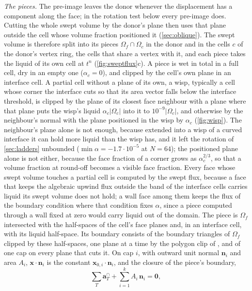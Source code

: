 \documentclass[preprint,12pt]{elsarticle}
\newcommand{\x}{\mathbf{x}}
\newcommand{\n}{\mathbf{n}}
\begin{document}
\emph{The pieces.} The pre-image leaves the donor whenever the displacement has a component along the face; in the rotation test below every pre-image does. Cutting the whole swept volume by the donor's plane then uses that plane outside the cell whose volume fraction positioned it (\cref{sec:oblique}). The swept volume is therefore split into its pieces $\Omega_f\cap\Omega_c$ in the donor and in the cells $c$ of the donor's vertex ring, the cells that share a vertex with it, and each piece takes the liquid of its own cell at $t^n$ (\cref{fig:sweptflux}c). A piece is wet in total in a full cell, dry in an empty one ($\alpha_c = 0$), and clipped by the cell's own plane in an interface cell. A partial cell without a plane of its own, a wisp, typically a cell whose corner the interface cuts so that its area vector falls below the interface threshold, is clipped by the plane of its closest face neighbour with a plane where that plane puts the wisp's liquid $\alpha_c|\Omega_c|$ into it to $10^{-9}|\Omega_c|$, and otherwise by the neighbour's normal with the plane positioned in the wisp by $\alpha_c$ (\cref{fig:wisp}). The neighbour's plane alone is not enough, because extended into a wisp of a curved interface it can hold more liquid than the wisp has, and it left the rotation of \cref{sec:ladders} unbounded ($\min\alpha = -1.7\cdot10^{-5}$ at $N = 64$); the positioned plane alone is not either, because the face fraction of a corner grows as $\alpha_c^{2/3}$, so that a volume fraction at round-off becomes a visible face fraction. Every face whose swept volume touches a partial cell is computed by the swept flux, because a face that keeps the algebraic upwind flux outside the band of the interface cells carries liquid its swept volume does not hold; a wall face among them keeps the flux of the boundary condition where that condition fixes $\alpha$, since a piece computed through a wall fixed at zero would carry liquid out of the domain. The piece is $\Omega_f$ intersected with the half-spaces of the cell's face planes and, in an interface cell, with its liquid half-space. Its boundary consists of the boundary triangles of $\Omega_f$ clipped by these half-spaces, one plane at a time by the polygon clip of \citet{SutherlandHodgman1974}, and of one cap on every plane that cuts it. On cap $i$, with outward unit normal $\n_i$ and area $A_i$, $\x\cdot\n_i$ is the constant $\x_{0,i}\cdot\n_i$, and the closure of the piece's boundary,
\begin{equation}
\sum_T \mathbf{a}_T^{\cap} + \sum_{i=1}^{k} A_i\,\n_i = \mathbf{0} ,
\label{eq:swept-closure}
\end{equation}
\end{document}
